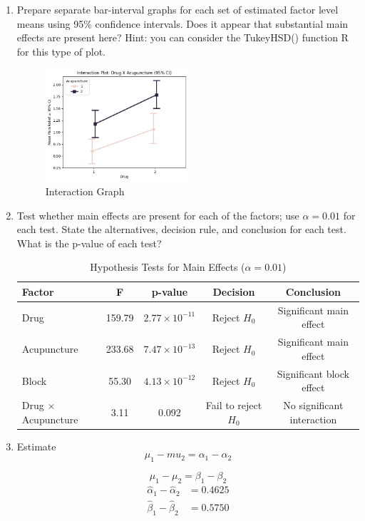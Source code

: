 \documentclass{article}
\begin{document}
\begin{enumerate}
	\item Prepare separate bar-interval graphs for each set of estimated factor level means using 95\%
	      confidence intervals. Does it appear that substantial main effects are present here? Hint: you
	      can consider the TukeyHSD() function R for this type of plot.
	      \begin{figure}[H]
		      \centering
		      \includegraphics[width=0.5\textwidth]{assets/interaction6.png}
		      \caption{Interaction Graph}
	      \end{figure}
	\item Test whether main effects are present for each of the factors; use $\alpha = 0.01$ for each test. State
	      the alternatives, decision rule, and conclusion for each test. What is the p-value of each test?
	      \begin{table}[!ht]
		      \centering
		      \caption{Hypothesis Tests for Main Effects ($\alpha = 0.01$)}
		      \begin{tabular}{lcccc}
			      \toprule
			      \textbf{Factor}           & \textbf{F} & \textbf{p-value}     & \textbf{Decision}    & \textbf{Conclusion}        \\
			      \midrule
			      Drug                      & 159.79     & $2.77\times10^{-11}$ & Reject $H_0$         & Significant main effect    \\
			      Acupuncture               & 233.68     & $7.47\times10^{-13}$ & Reject $H_0$         & Significant main effect    \\
			      Block                     & 55.30      & $4.13\times10^{-12}$ & Reject $H_0$         & Significant block effect   \\
			      Drug $\times$ Acupuncture & 3.11       & 0.092                & Fail to reject $H_0$ & No significant interaction \\
			      \bottomrule
		      \end{tabular}
	      \end{table}
	\item Estimate
	      $$
		      \mu_1 - mu_2 = \alpha_1 - \alpha_2
	      $$

	      $$
		      \mu_1 - \mu_2 = \beta_1 - \beta_2
	      $$
	      \begin{align*}
		      \hat{\alpha}_1 - \hat{\alpha}_2 & = 0.4625 \\
		      \hat{\beta}_1 - \hat{\beta}_2   & = 0.5750
	      \end{align*}

\end{enumerate}
\end{document}
